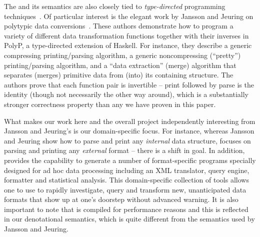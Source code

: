 
The \ddc{} and its semantics are also closely tied to 
{\em type-directed} programming techniques~\cite{harper+:intensional,jansson+:97,weirich+:flexible-type-analysis,jansson:phdthesis,hinze:generic}.  Of particular
interest is the elegant work by Jansson and Jeuring
on polytypic data conversions~\cite{jansson+:99,jansson+:02}.
These authors demonstrate how to program a variety of different
data transformation functions together with their inverses
in PolyP, a type-directed extension of Haskell.  For instance,
they describe a generic compressing printing/parsing algorithm, 
a generic noncompressing (``pretty'') printing/parsing algorithm, and
a ``data extraction'' (merge) algorithm that separates (merges)
primitive data from (into) its containing structure.
The authors prove that each function pair is invertible --
print followed by parse is the identity (though not necessarily
the other way around), which is a substantially stronger 
correctness property than any we have proven in this paper.

What makes our work here and the overall \pads{} project
independently interesting from Jansson and Jeuring's
is our domain-specific focus.  For instance,
whereas Jansson and Jeuring show how to parse and print any 
{\em internal} data structure, \pads{} focuses on parsing and printing any {\em
external} format -- there is a shift in goal.  In addition, \pads{}
provides the capability to generate a number of format-specific
programs specially designed
for ad hoc data processing including an XML translator, query engine,
formatter and statistical analysis.  This domain-specific collection of tools
allows one to use \pads{} to rapidly investigate, query and transform new, 
unanticipated data formats that show up at one's doorstep without
advanced warning. 
It is also important to note that \pads{} is compiled for performance reasons
and this is reflected in our
denotational semantics, which is quite different from
the semantics used by Jansson and Jeuring.

